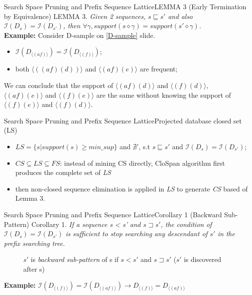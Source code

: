 \documentclass[12pt]{beamer}
\newcommand{\splitline}{\vspace{0.4cm}}
\begin{document}
\begin{frame}{Search Space Pruning and Prefix Sequence Lattice}{LEMMA 3 (Early Termination by Equivalence)}
LEMMA 3. {\it Given 2 sequences, $s \sqsubseteq s'$ and also $\mathcal{I}(D_s) = \mathcal{I}(D_{s'})$, then $\forall\gamma, support(s \diamond \gamma) = support(s' \diamond \gamma)$.}\\
\splitline
{\bf Example:} Consider D-sample on \ref{D-sample} slide.
\begin{itemize}
\item $\mathcal{I}(D_{\langle (af) \rangle}) = \mathcal{I}(D_{\langle (f) \rangle})$;
\item both $\langle ((af)(d)) \rangle$ and $\langle (af)(e) \rangle$ are frequent;
\end{itemize}
We can conclude that the support of $\langle (af)(d) \rangle$ and $\langle (f)(d) \rangle$, $\langle (af)(e) \rangle$ and $\langle (f)(e) \rangle$ are the same without knowing the support of $\langle (f)(e) \rangle$ and $\langle (f)(d) \rangle$.
\end{frame}

\begin{frame}{Search Space Pruning and Prefix Sequence Lattice}{Projected database closed set (LS)}
\begin{itemize}
\item $LS = \{s | support(s) \geq min\_sup \}$ and $\nexists'$, s.t $s \sqsubseteq s'$ and  $\mathcal{I}(D_s) = \mathcal{I}(D_{s'})$;
\item $CS \subseteq LS \subseteq FS$: instead of mining CS directly, CloSpan algorithm first produces the complete set of {\it LS}
\item then non-closed sequence elimination is applied in  {\it LS} to generate {\it CS} based of Lemma 3.
\end{itemize}
\end{frame}

\begin{frame}{Search Space Pruning and Prefix Sequence Lattice}{Corollary 1 (Backward Sub-Pattern)}
Corollary 1. {\it If a sequence s < s' and $s \sqsupset s'$, the condition of $\mathcal{I}(D_s) = \mathcal{I}(D_{s'})$ is sufficient to stop searching any descendant of $s'$ in the prefix searching tree.}
\begin{figure}
\caption*{$s'$ is {\it backward sub-pattern} of s if $s < s'$ and $s \sqsupset s'$ ($s'$ is discovered after s)}
\end{figure}
{\bf Example:} $\mathcal{I}(D_{\langle (f) \rangle}) = \mathcal{I}(D_{\langle (af) \rangle}) \rightarrow D_{\langle (f) \rangle} = D_{\langle (af) \rangle}$
\end{frame}
\end{document}
